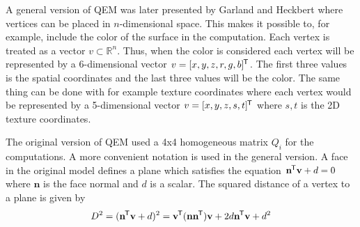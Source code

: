 A general version of QEM was later presented by Garland and Heckbert \cite{garland1998simplifying} where vertices can be placed in $n$-dimensional space. This makes it possible to, for example, include the color of the surface in the computation. Each vertex is treated as a vector \(v \subset \mathbb{R}^n\). Thus, when the color is considered each vertex will be represented by a 6-dimensional vector \(v = [x, y, z, r, g, b]^{\mkern-1.5mu\mathsf{T}}\). The first three values is the spatial coordinates and the last three values will be the color. The same thing can be done with for example texture coordinates where each vertex would be represented by a 5-dimensional vector \(v = [x, y, z, s, t]^{\mkern-1.5mu\mathsf{T}}\) where $s, t$ is the 2D texture coordinates.

The original version of QEM used a 4x4 homogeneous matrix $Q_i$ for the computations. A more convenient notation is used in the general version. A face in the original model defines a plane which satisfies the equation \(\mathbf{n}^{\mkern-1.5mu\mathsf{T}} \mathbf{v} + d = 0\) where \(\mathbf{n}\) is the face normal and \(d\) is a scalar. The squared distance of a vertex to a plane is given by
\begin{equation}
  D^2 = (\mathbf{n}^{\mkern-1.5mu\mathsf{T}}\mathbf{v} + d)^2 = \mathbf{v}^{\mkern-1.5mu\mathsf{T}}(\mathbf{nn}^{\mkern-1.5mu\mathsf{T}})\mathbf{v} + 2d\mathbf{n}^{\mkern-1.5mu\mathsf{T}}\mathbf{v} + d^2
\end{equation}

